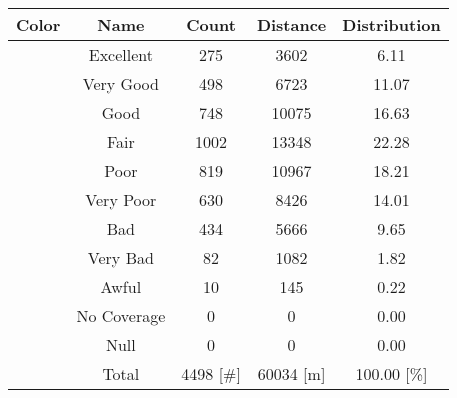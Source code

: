 \begin{tabular}{|c|c|c|c|c|}\hline
\rowcolor{Plum!20}
Color&Name&Count&Distance&Distribution\\\hline\hline
\cellcolor[HTML]{00703c} &Excellent&275&3602&6.11\\\hline
\cellcolor[HTML]{00a032} &Very Good&498&6723&11.07\\\hline
\cellcolor[HTML]{00d228} &Good&748&10075&16.63\\\hline
\cellcolor[HTML]{ffff00} &Fair&1002&13348&22.28\\\hline
\cellcolor[HTML]{ffaa00} &Poor&819&10967&18.21\\\hline
\cellcolor[HTML]{fa6400} &Very Poor&630&8426&14.01\\\hline
\cellcolor[HTML]{ff0000} &Bad&434&5666&9.65\\\hline
\cellcolor[HTML]{dc143c} &Very Bad&82&1082&1.82\\\hline
\cellcolor[HTML]{820000} &Awful&10&145&0.22\\\hline
\cellcolor[HTML]{aaaaaa} &No Coverage&0&0&0.00\\\hline
\cellcolor[HTML]{000000} &Null&0&0&0.00\\\hline
\cellcolor[HTML]{ffffff} &Total&4498 [\#]&60034 [m]&100.00 [\%]\\\hline
\end{tabular}
